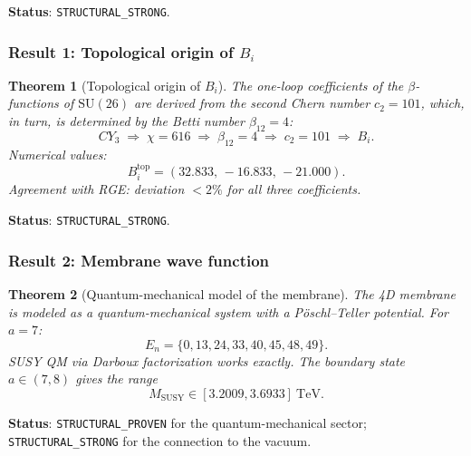 \documentclass[11pt,a4paper]{article}
\newcommand{\SU}{\ensuremath{\mathrm{SU}}}
\newcommand{\CY}{\ensuremath{CY_3}}
\newtheorem{theorem}{Theorem}[section]
\theoremstyle{definition}
\begin{document}
\medskip\noindent
\textbf{Status}: \texttt{STRUCTURAL\_STRONG}.

\subsubsection{Result 1: Topological origin of \texorpdfstring{$B_i$}{B\_i}}

\begin{theorem}[Topological origin of $B_i$]
\label{thm:conclusion-bi}
The one-loop coefficients of the $\beta$-functions of $\SU(26)$
are derived from the second Chern number $c_2 = 101$, which,
in turn, is determined by the Betti number $\beta_{12} = 4$:
\begin{equation}
    \CY \;\Rightarrow\; \chi = 616
    \;\Rightarrow\; \beta_{12} = 4
    \;\Rightarrow\; c_2 = 101
    \;\Rightarrow\; B_i.
    \label{eq:conclusion-chain-bi}
\end{equation}
Numerical values:
\begin{equation}
    \boxed{
    B_i^{\text{top}} = (32.833, \, -16.833, \, -21.000).
    }
    \label{eq:conclusion-bi-values}
\end{equation}
Agreement with RGE: deviation $< 2\%$ for all three coefficients.
\end{theorem}

\medskip\noindent
\textbf{Status}: \texttt{STRUCTURAL\_STRONG}.

\subsubsection{Result 2: Membrane wave function}

\begin{theorem}[Quantum-mechanical model of the membrane]
\label{thm:conclusion-membrane}
The 4D membrane is modeled as a quantum-mechanical system
with a P\"oschl--Teller potential. For $a = 7$:
\begin{equation}
    \boxed{
    E_n = \{0, 13, 24, 33, 40, 45, 48, 49\}.
    }
\end{equation}
SUSY QM via Darboux factorization works exactly.
The boundary state $a \in (7, 8)$ gives the range
\begin{equation}
    \boxed{
    M_{\text{SUSY}} \in [3.2009, 3.6933]~\text{TeV}.
    }
\end{equation}
\end{theorem}

\medskip\noindent
\textbf{Status}: \texttt{STRUCTURAL\_PROVEN} for the
quantum-mechanical sector; \texttt{STRUCTURAL\_STRONG}
for the connection to the vacuum.
\end{document}
